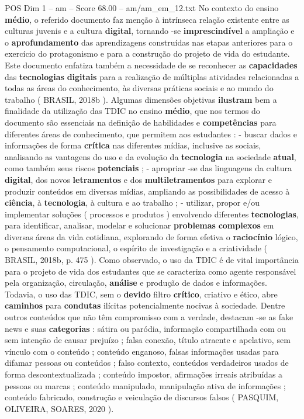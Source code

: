 \begin{textsample}{POS Dim 1 – am – Score 68.00 – am/am\_em\_12.txt}
No contexto do ensino \textbf{médio}, o referido documento faz menção à intrínseca relação existente entre as culturas juvenis e a cultura \textbf{digital}, tornando -se \textbf{imprescindível} a ampliação e o \textbf{aprofundamento} das aprendizagens construídas nas etapas anteriores para o exercício do protagonismo e para a construção do projeto de vida do estudante.
Este documento enfatiza também a necessidade de se reconhecer as \textbf{capacidades} das \textbf{tecnologias} \textbf{digitais} para a realização de múltiplas atividades relacionadas a todas as áreas do conhecimento, às diversas práticas sociais e ao mundo do trabalho ( BRASIL, 2018b ).
Algumas dimensões objetivas \textbf{ilustram} bem a finalidade da utilização das TDIC no ensino \textbf{médio}, que nos termos do documento são essenciais na definição de habilidades e \textbf{competências} para diferentes áreas de conhecimento, que permitem aos estudantes : - buscar dados e informações de forma \textbf{crítica} nas diferentes mídias, inclusive as sociais, analisando as vantagens do uso e da evolução da \textbf{tecnologia} na sociedade \textbf{atual}, como também seus riscos \textbf{potenciais} ; - apropriar -se das linguagens da cultura \textbf{digital}, dos novos \textbf{letramentos} e dos \textbf{multiletramentos} para explorar e produzir conteúdos em diversas mídias, ampliando as possibilidades de acesso à \textbf{ciência}, à \textbf{tecnologia}, à cultura e ao trabalho ; - utilizar, propor e/ou implementar soluções ( processos e produtos ) envolvendo diferentes \textbf{tecnologias}, para identificar, analisar, modelar e solucionar \textbf{problemas} \textbf{complexos} em diversas áreas da vida cotidiana, explorando de forma efetiva o \textbf{raciocínio} lógico, o pensamento computacional, o espírito de investigação e a criatividade ( BRASIL, 2018b, p. 475 ).
Como observado, o uso da TDIC é de vital importância para o projeto de vida dos estudantes que se caracteriza como agente responsável pela organização, circulação, \textbf{análise} e produção de dados e informações.
Todavia, o uso das TDIC, sem o \textbf{devido} filtro \textbf{crítico}, criativo e ético, abre \textbf{caminhos} para \textbf{condutas} ilícitas potencialmente nocivas à sociedade.
Dentre outros conteúdos que não têm compromisso com a verdade, destacam -se as fake news e suas \textbf{categorias} : sátira ou paródia, informação compartilhada com ou sem intenção de causar prejuízo ; falsa conexão, título atraente e apelativo, sem vínculo com o conteúdo ; conteúdo enganoso, falsas informações usadas para difamar pessoas ou conteúdos ; falso contexto, conteúdos verdadeiros usados de forma descontextualizada ; conteúdo impostor, afirmações irreais atribuídas a pessoas ou marcas ; conteúdo manipulado, manipulação ativa de informações ; conteúdo fabricado, construção e veiculação de discursos falsos ( PASQUIM, OLIVEIRA, SOARES, 2020 ).

\end{textsample}
